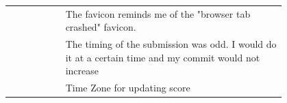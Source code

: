 \begin{longtable}{r|p{0.8\linewidth}}
		& The favicon reminds me of the "browser tab crashed" favicon.                                                                                                                                                                                                                                                                                                                                                                                                                                                                                                                                                                                                                                                                                     \\
		& The timing of the submission was odd. I would do it at a certain time and my commit would not increase                                                                                                                                                                                                                                                                                                                                                                                                                                                                                                                                                                                                                                           \\
		& Time Zone for updating score        
\end{longtable}

